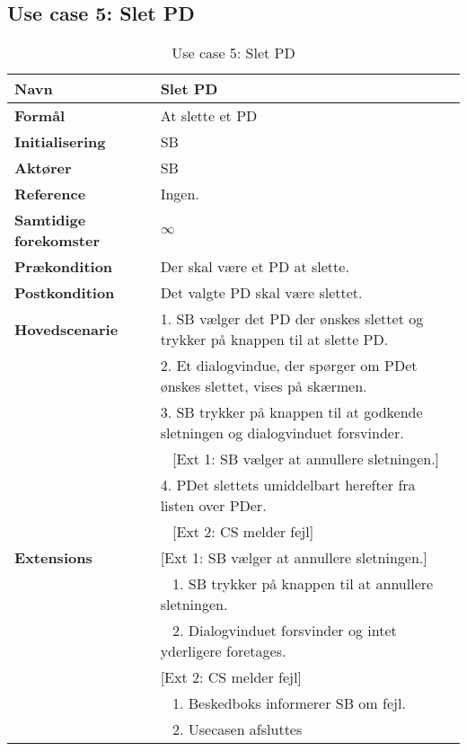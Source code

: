\subsection{Use case 5: Slet \gls{PD}}


\begin{table}[H]
\begin{tabularx}{\textwidth}{|l|X|}
\hline
\textbf{Navn}					& Slet \gls{PD} \\\hline
\textbf{Formål}					& At slette et \gls{PD} \\\hline
\textbf{Initialisering}			& \gls{SB} \\\hline
\textbf{Aktører}				& \gls{SB} \\\hline
\textbf{Reference}				& Ingen. \\\hline								
\textbf{Samtidige forekomster}	& $\infty$ \\\hline
\textbf{Prækondition}			& Der skal være et \gls{PD} at slette. \\\hline
\textbf{Postkondition}			& Det valgte \gls{PD} skal være slettet. \\
\hline
\textbf{Hovedscenarie}			& 1. \gls{SB} vælger det \gls{PD} der ønskes slettet og trykker på knappen til at slette \gls{PD}.\\												
								& 2. Et dialogvindue, der spørger om \gls{PD}et ønskes slettet, vises på skærmen.\\
								& 3. \gls{SB} trykker på knappen til at godkende sletningen og dialogvinduet forsvinder.\\
								& ~ [Ext 1: \gls{SB} vælger at annullere sletningen.]\\
								& 4. \gls{PD}et slettets umiddelbart herefter fra listen over \gls{PD}er.\\
								& ~ [Ext 2: \gls{CS} melder fejl]\\
\hline
\textbf{Extensions}				& [Ext 1: \gls{SB} vælger at annullere sletningen.]\\
								& ~ 1. \gls{SB} trykker på knappen til at annullere sletningen.\\
								& ~ 2. Dialogvinduet forsvinder og intet yderligere foretages.\\
								& [Ext 2: \gls{CS} melder fejl] \\
								& ~ 1. Beskedboks informerer \gls{SB} om fejl. \\
								& ~ 2. Usecasen afsluttes \\\hline
\hline
\end{tabularx}
\caption{Use case 5: Slet \gls{PD}}
\label{tab:UCsp}
\end{table}